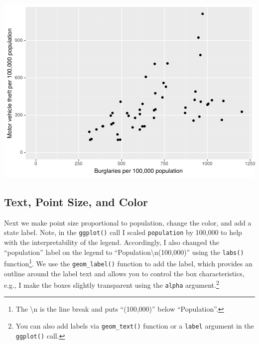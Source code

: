 \documentclass[
]{krantz}
\begin{document}
\includegraphics{bookdown_files/figure-latex/unnamed-chunk-69-1.pdf}

\hypertarget{text-point-size-and-color}{%
\subsection{Text, Point Size, and Color}\label{text-point-size-and-color}}

Next we make point size proportional to population, change the color, and add a state label. Note, in the \texttt{ggplot()} call I scaled \texttt{population} by 100,000 to help with the interpretability of the legend. Accordingly, I also changed the ``population'' label on the legend to ``Population\textbackslash n(100,000)'' using the \texttt{labs()} function\footnote{The \textbackslash n is the line break and puts ``(100,000)'' below ``Population''.}. We use the \texttt{geom\_label()} function to add the label, which provides an outline around the label text and allows you to control the box characteristics, e.g., I make the boxes slightly transparent using the \texttt{alpha} argument.\footnote{You can also add labels via \texttt{geom\_text()} function or a \texttt{label} argument in the \texttt{ggplot()} call.}
\end{document}
